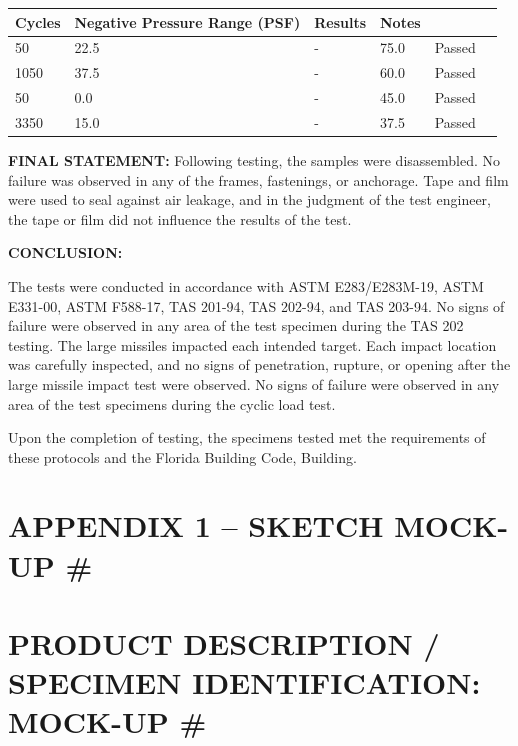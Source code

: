 \begin{longtable}[]{@{}llllll@{}}
\toprule
\textbf{Cycles} & \textbf{Negative Pressure Range (PSF)} &
\textbf{Results} & \textbf{Notes} & &\tabularnewline
\midrule
\endhead
50 & 22.5 & - & 75.0 & Passed &\tabularnewline
1050 & 37.5 & - & 60.0 & Passed &\tabularnewline
50 & 0.0 & - & 45.0 & Passed &\tabularnewline
3350 & 15.0 & - & 37.5 & Passed &\tabularnewline
\bottomrule
\end{longtable}

\textbf{FINAL STATEMENT:} Following testing, the samples were
disassembled. No failure was observed in any of the frames, fastenings,
or anchorage. Tape and film were used to seal against air leakage, and
in the judgment of the test engineer, the tape or film did not influence
the results of the test.

\textbf{CONCLUSION:}

The tests were conducted in accordance with ASTM E283/E283M-19, ASTM
E331-00, ASTM F588-17, TAS 201-94, TAS 202-94, and TAS 203-94. No signs
of failure were observed in any area of the test specimen during the TAS
202 testing. The large missiles impacted each intended target. Each
impact location was carefully inspected, and no signs of penetration,
rupture, or opening after the large missile impact test were observed.
No signs of failure were observed in any area of the test specimens
during the cyclic load test.

Upon the completion of testing, the specimens tested met the
requirements of these protocols and the Florida Building Code, Building.

\hypertarget{appendix-1-sketch-mock-up}{%
\section{\texorpdfstring{\textbf{APPENDIX 1 -- SKETCH MOCK-UP \#}
}{APPENDIX 1 -- SKETCH MOCK-UP \# }}\label{appendix-1-sketch-mock-up}}

\hypertarget{product-description-specimen-identification-mock-up-1}{%
\section{\texorpdfstring{\textbf{PRODUCT DESCRIPTION / SPECIMEN
IDENTIFICATION: MOCK-UP \#}
}{PRODUCT DESCRIPTION / SPECIMEN IDENTIFICATION: MOCK-UP \# }}\label{product-description-specimen-identification-mock-up-1}}

